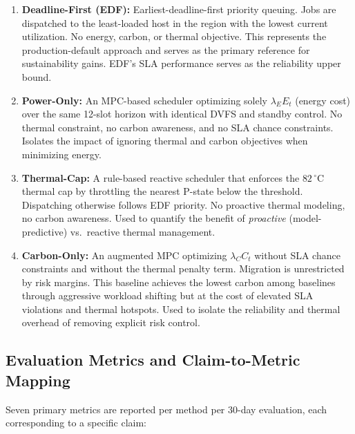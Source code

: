 \documentclass[a4paper,fleqn]{cas-dc}
\begin{document}
\begin{enumerate}
  \item \textbf{Deadline-First (EDF):} Earliest-deadline-first priority queuing. Jobs are dispatched to the least-loaded host in the region with the lowest current utilization. No energy, carbon, or thermal objective. This represents the production-default approach and serves as the primary reference for sustainability gains. EDF's SLA performance serves as the reliability upper bound.

  \item \textbf{Power-Only:} An MPC-based scheduler optimizing solely $\lambda_E E_t$ (energy cost) over the same 12-slot horizon with identical DVFS and standby control. No thermal constraint, no carbon awareness, and no SLA chance constraints. Isolates the impact of ignoring thermal and carbon objectives when minimizing energy.

  \item \textbf{Thermal-Cap:} A rule-based reactive scheduler that enforces the $82\,^\circ$C thermal cap by throttling the nearest P-state below the threshold. Dispatching otherwise follows EDF priority. No proactive thermal modeling, no carbon awareness. Used to quantify the benefit of \emph{proactive} (model-predictive) vs.\ reactive thermal management.

  \item \textbf{Carbon-Only:} An augmented MPC optimizing $\lambda_C C_t$ without SLA chance constraints and without the thermal penalty term. Migration is unrestricted by risk margins. This baseline achieves the lowest carbon among baselines through aggressive workload shifting but at the cost of elevated SLA violations and thermal hotspots. Used to isolate the reliability and thermal overhead of removing explicit risk control.
\end{enumerate}

\subsection{Evaluation Metrics and Claim-to-Metric Mapping}
\label{sec:metrics}

Seven primary metrics are reported per method per 30-day evaluation, each corresponding to a specific claim:
\end{document}
